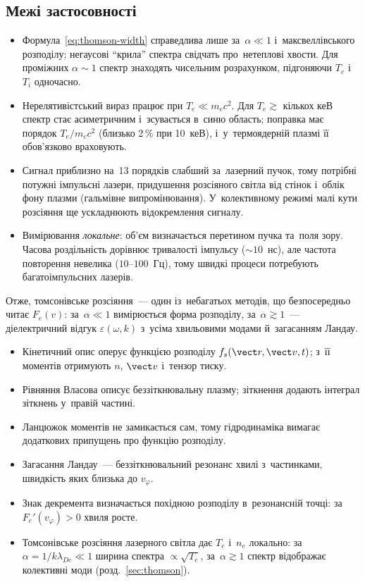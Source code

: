 \subsection*{Межі застосовності}
\begin{itemize}
\item Формула~\eqref{eq:thomson-width} справедлива лише за~$\alpha\ll1$ і~максвеллівського
  розподілу; негаусові \enquote{крила} спектра свідчать про~нетеплові хвости. Для проміжних $\alpha\sim1$
  спектр знаходять чисельним розрахунком, підгоняючи $T_e$ і~$T_i$ одночасно.
\item Нерелятивістський вираз працює при $T_e\ll m_ec^2$. Для $T_e\gtrsim$ кількох кеВ
  спектр стає асиметричним і~зсувається в~синю область; поправка має порядок $T_e/m_ec^2$
  (близько 2\,\% при 10~кеВ), і~у~термоядерній плазмі її обов'язково враховують.
\item Сигнал приблизно на~13 порядків слабший за~лазерний пучок, тому потрібні потужні імпульсні
  лазери, придушення розсіяного світла від стінок і~облік фону плазми (гальмівне випромінювання).
  У~колективному режимі малі кути розсіяння ще ускладнюють відокремлення сигналу.
\item Вимірювання \emph{локальне}: об'єм визначається перетином пучка та~поля зору. Часова
  роздільність дорівнює тривалості імпульсу ($\sim10$~нс), але частота повторення
  невелика ($10$--$100$~Гц), тому швидкі процеси потребують багатоімпульсних лазерів.
\end{itemize}

Отже, томсонівське розсіяння~--- один із~небагатьох методів, що безпосередньо читає $F_e(v)$:
за~$\alpha\ll1$ вимірюється форма розподілу, за~$\alpha\gtrsim1$~--- діелектричний відгук
$\varepsilon(\omega,k)$ з~усіма хвильовими модами й~загасанням Ландау.

\begin{Summary}
\begin{itemize}
\item Кінетичний опис оперує функцією розподілу $f_s(\vect r,\vect v,t)$; з~її моментів отримують $n$, $\vect v$ і~тензор тиску.
\item Рівняння Власова описує беззіткнювальну плазму; зіткнення додають інтеграл зіткнень у~правій частині.
\item Ланцюжок моментів не замикається сам, тому гідродинаміка вимагає додаткових припущень про функцію розподілу.
\item Загасання Ландау~--- беззіткнювальний резонанс хвилі з~частинками, швидкість яких близька до $v_\varphi$.
\item Знак декремента визначається похідною розподілу в~резонансній точці: за $F_e'(v_\varphi)>0$ хвиля росте.
\item Томсонівське розсіяння лазерного світла дає $T_e$ і~$n_e$ локально: за $\alpha=1/k\lambda_{De}\ll1$ ширина спектра $\propto\sqrt{T_e}$, за~$\alpha\gtrsim1$ спектр відображає колективні моди (розд.~\ref{sec:thomson}).
\end{itemize}
\end{Summary}

